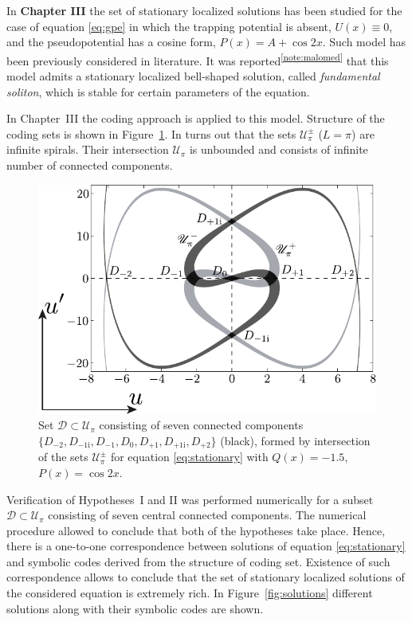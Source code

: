 \documentclass[candidate, href, colorlinks]{disser}
\begin{document}
In \textbf{Chapter III} the set of stationary localized solutions has been studied for the case of equation \eqref{eq:gpe} in which the trapping potential is absent, $U(x) \equiv 0$, and the pseudopotential has a cosine form, $P(x) = A + \cos 2x$.
Such model has been previously considered in literature.
It was reported\textsuperscript{\ref{note:malomed}} that this model admits a stationary localized bell-shaped solution, called {\it fundamental soliton}, which is stable for certain parameters of the equation.

In Chapter~III the coding approach is applied to this model.
Structure of the coding sets is shown in Figure~\ref{fig:island-set}.
In turns out that the sets $\mathscr{U}_{\pi}^{\pm}$ ($L = \pi$) are infinite spirals.
Their intersection $\mathscr{U}_{\pi}$ is unbounded and consists of infinite number of connected components.

\begin{figure}[h]
\centering
	\includegraphics[scale = 1]{../pic/island set to check hypotheses for cosine equation}
	\caption{
		Set $\mathcal{D} \subset \mathscr{U}_{\pi}$ consisting of seven connected components $\{ D_{-2}, D_{-1\mathrm{i}}, D_{-1}, D_0, D_{+1}, D_{+1\mathrm{i}}, D_{+2} \}$ (black), formed by intersection of the sets $\mathscr{U}_{\pi}^{\pm}$ for equation \eqref{eq:stationary} with $Q(x) = -1.5$, $P(x) = \cos 2x$.
	}
\label{fig:island-set}
\end{figure}

Verification of Hypotheses~I and II was performed numerically for a subset $\mathcal{D} \subset \mathscr{U}_{\pi}$ consisting of seven central connected components.
The numerical procedure allowed to conclude that both of the hypotheses take place.
Hence, there is a one-to-one correspondence between solutions of equation \eqref{eq:stationary} and symbolic codes derived from the structure of coding set.
Existence of such correspondence allows to conclude that the set of stationary localized solutions of the considered equation is extremely rich.
In Figure~\ref{fig:solutions} different solutions along with their symbolic codes are shown.
\end{document}
